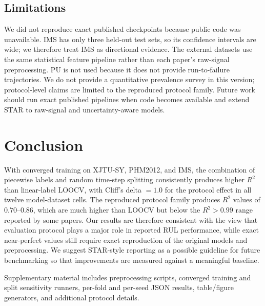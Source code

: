 \documentclass[pdflatex,sn-mathphys-num]{sn-jnl}
\begin{document}
\subsection{Limitations}
We did not reproduce exact published checkpoints because public code was unavailable. IMS has only three held-out test sets, so its confidence intervals are wide; we therefore treat IMS as directional evidence. The external datasets use the same statistical feature pipeline rather than each paper's raw-signal preprocessing. PU is not used because it does not provide run-to-failure trajectories. We do not provide a quantitative prevalence survey in this version; protocol-level claims are limited to the reproduced protocol family. Future work should run exact published pipelines when code becomes available and extend STAR to raw-signal and uncertainty-aware models.

\section{Conclusion}
With converged training on XJTU-SY, PHM2012, and IMS, the combination of piecewise labels and random time-step splitting consistently produces higher $R^2$ than linear-label LOOCV, with Cliff's delta $=1.0$ for the protocol effect in all twelve model-dataset cells. The reproduced protocol family produces $R^2$ values of $0.70$--$0.86$, which are much higher than LOOCV but below the $R^2>0.99$ range reported by some papers. Our results are therefore consistent with the view that evaluation protocol plays a major role in reported RUL performance, while exact near-perfect values still require exact reproduction of the original models and preprocessing. We suggest STAR-style reporting as a possible guideline for future benchmarking so that improvements are measured against a meaningful baseline.

\backmatter

Supplementary material includes preprocessing scripts, converged training and split sensitivity runners, per-fold and per-seed JSON results, table/figure generators, and additional protocol details.
\end{document}
